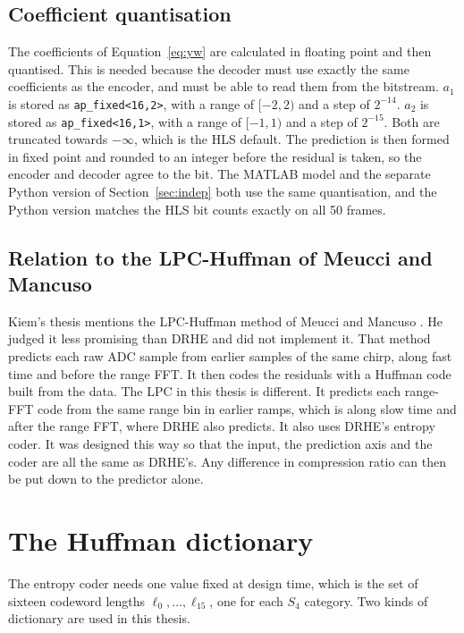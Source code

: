 \subsection{Coefficient quantisation}

The coefficients of Equation~\eqref{eq:yw} are calculated in floating point and
then quantised. This is needed because the decoder must use exactly the same
coefficients as the encoder, and must be able to read them from the bitstream.
$a_1$ is stored as \texttt{ap\_fixed<16,2>}, with a range of $[-2, 2)$ and a
step of $2^{-14}$. $a_2$ is stored as \texttt{ap\_fixed<16,1>}, with a range of
$[-1, 1)$ and a step of $2^{-15}$. Both are truncated towards $-\infty$, which
is the HLS default. The prediction is then formed in fixed point and rounded to
an integer before the residual is taken, so the encoder and decoder agree to
the bit. The MATLAB model and the separate Python version of
Section~\ref{sec:indep} both use the same quantisation, and the Python version
matches the HLS bit counts exactly on all 50 frames.

\subsection{Relation to the LPC-Huffman of Meucci and Mancuso}
\label{sec:lpc_notkiem}

Kiem's thesis mentions the LPC-Huffman method of Meucci and Mancuso
\cite{meucci2022}. He judged it less promising than DRHE and did not implement
it. That method predicts each raw ADC sample from earlier samples of the same
chirp, along fast time and before the range FFT. It then codes the residuals
with a Huffman code built from the data. The LPC in this thesis is different.
It predicts each range-FFT code from the same range bin in earlier ramps, which
is along slow time and after the range FFT, where DRHE also predicts. It also
uses DRHE's entropy coder. It was designed this way so that the input, the
prediction axis and the coder are all the same as DRHE's. Any difference in
compression ratio can then be put down to the predictor alone.

\section{The Huffman dictionary}
\label{sec:dict}

The entropy coder needs one value fixed at design time, which is the set of
sixteen codeword lengths $\ell_0, \ldots, \ell_{15}$, one for each $S_4$
category. Two kinds of dictionary are used in this thesis.

